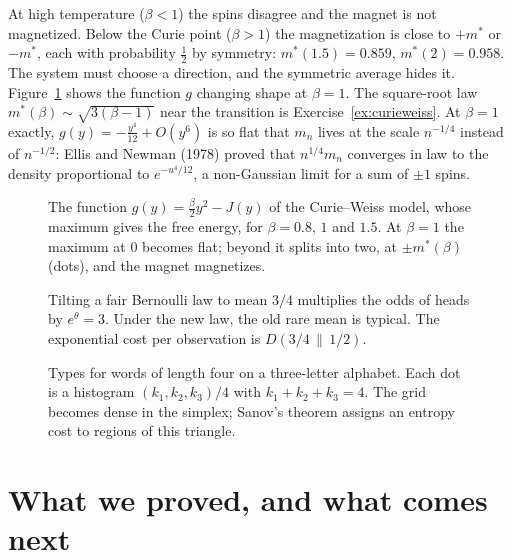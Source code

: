 At high temperature ($\beta<1$) the spins disagree and the magnet is not magnetized. Below the Curie point ($\beta>1$) the magnetization is close to $+m^*$ or $-m^*$, each with
probability $\frac12$ by symmetry: $m^*(1.5)=0.859$, $m^*(2)=0.958$. The system must choose a direction, and the symmetric average hides it. Figure~\ref{fig:curieweiss} shows the
function $g$ changing shape at $\beta=1$. The square-root law $m^*(\beta)\sim\sqrt{3(\beta-1)}$ near the transition is Exercise~\ref{ex:curieweiss}. At $\beta=1$ exactly, $g(y)=-\frac{y^4}{12}+O(y^6)$ is so flat that
$m_n$ lives at the scale $n^{-1/4}$ instead of $n^{-1/2}$: Ellis and Newman (1978) proved that $n^{1/4}m_n$ converges in law to the density proportional to $e^{-u^4/12}$, a
non-Gaussian limit for a sum of $\pm1$ spins.

\begin{figure}[ht]
\centering{}
\caption{The function $g(y)=\frac\beta2y^2-J(y)$ of the Curie--Weiss model, whose maximum gives the free energy, for $\beta=0.8$, $1$ and $1.5$. At $\beta=1$ the maximum at $0$
becomes flat; beyond it splits into two, at $\pm m^*(\beta)$ (dots), and the magnet magnetizes.}
\label{fig:curieweiss}
\end{figure}

\begin{figure}[ht]
\centering{}
\caption{Tilting a fair Bernoulli law to mean $3/4$ multiplies the odds of heads by $e^\theta=3$. Under the new law, the old rare mean is typical. The exponential cost per observation is $D(3/4\,\|\,1/2)$.}
\label{fig:v11-ch07-tilt-coin}
\end{figure}

\begin{figure}[ht]
\centering{}
\caption{Types for words of length four on a three-letter alphabet. Each dot is a histogram $(k_1,k_2,k_3)/4$ with $k_1+k_2+k_3=4$. The grid becomes dense in the simplex; Sanov's theorem assigns an entropy cost to regions of this triangle.}
\label{fig:v11-ch07-types-triangle}
\end{figure}

\section{What we proved, and what comes next}

